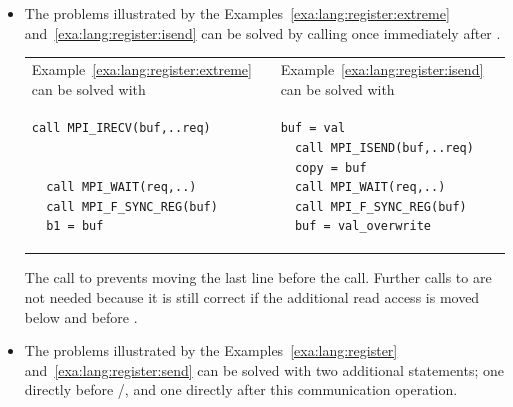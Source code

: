 \begin{itemize}
\item The problems illustrated by the
   Examples~\ref{exa:lang:register:extreme} and~\ref{exa:lang:register:isend}
   can be solved by calling 
   once immediately after .
\begin{center}
\vspace*{2pt}%
\begin{tabular}{p{67mm}p{67mm}}
Example~\ref{exa:lang:register:extreme} can be solved with
&
Example~\ref{exa:lang:register:isend} can be solved with
\\[-6pt]%
\begin{lstlisting}[language={[MPI]Fortran}]
  call MPI_IRECV(buf,..req)
 
 
  call MPI_WAIT(req,..)
  call MPI_F_SYNC_REG(buf)
  b1 = buf
\end{lstlisting}
&
\begin{lstlisting}[language={[MPI]Fortran}]
  buf = val
  call MPI_ISEND(buf,..req)
  copy = buf
  call MPI_WAIT(req,..)
  call MPI_F_SYNC_REG(buf)
  buf = val_overwrite
\end{lstlisting}
\\[-9pt]%
\end{tabular}
\end{center}
  The call to  prevents moving the last line
  before the  call.
  Further calls to  are not needed
  because it is still correct if the additional read access 
  is moved below  and before .

\item The problems illustrated by the
   Examples~\ref{exa:lang:register} and~\ref{exa:lang:register:send}
   can be solved with two additional 
   statements;
   one directly before /,
   and one directly after this communication operation.


\end{itemize}
